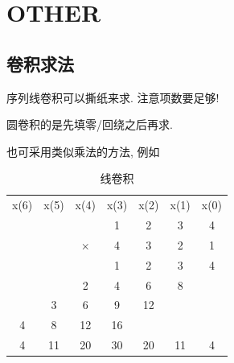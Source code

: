 \documentclass{ctexart}
\newlength{\Oldarrayrulewidth}
\newcommand{\Hline}[1]{
  \noalign{\global\setlength{\Oldarrayrulewidth}{\arrayrulewidth}}
  \noalign{\global\setlength{\arrayrulewidth}{#1}}\hline
  \noalign{\global\setlength{\arrayrulewidth}{\Oldarrayrulewidth}}}
\newcommand{\Midline}{\Hline{0.05em}}
\begin{document}
\section{OTHER}
\subsection{卷积求法}
    序列线卷积可以撕纸来求. 注意项数要足够!\par
    圆卷积的是先填零/回绕之后再求.\par
    也可采用类似乘法的方法, 例如

    \begin{table}[ht!]
        \centering
        \begin{tabular}{*{7}{c}}
        x(6) & x(5) & x(4)     & x(3) & x(2) & x(1) & x(0) \\
        \Midline
             &      &          & 1    & 2    & 3    & 4    \\
             &      & $\times$ & 4    & 3    & 2    & 1    \\
        \Midline
             &      &          & 1    & 2    & 3    & 4    \\
             &      & 2        & 4    & 6    & 8    &      \\
             & 3    & 6        & 9    & 12   &      &      \\
        4    & 8    & 12       & 16   &      &      &      \\
        \Midline
        4    & 11   & 20       & 30   & 20   & 11   & 4    \\
        \end{tabular}
        \caption{线卷积}
    \end{table}
\end{document}
